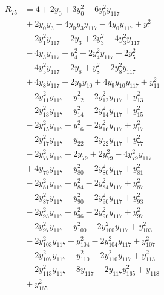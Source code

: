 \begin{align*}
R_{75} &={} 4 +2y_{0} +3y_{0}^{2} -6y_{0}^{2}y_{117} \\
 &{} +2y_{0}y_{3} -4y_{0}y_{3}y_{117} -4y_{0}y_{117} +y_{1}^{2} \\
 &{} -2y_{1}^{2}y_{117} +2y_{3} +2y_{3}^{2} -4y_{3}^{2}y_{117} \\
 &{} -4y_{3}y_{117} +y_{4}^{2} -2y_{4}^{2}y_{117} +2y_{5}^{2} \\
 &{} -4y_{5}^{2}y_{117} -2y_{8} +y_{8}^{2} -2y_{8}^{2}y_{117} \\
 &{} +4y_{8}y_{117} -2y_{9}y_{10} +4y_{9}y_{10}y_{117} +y_{11}^{2} \\
 &{} -2y_{11}^{2}y_{117} +y_{12}^{2} -2y_{12}^{2}y_{117} +y_{13}^{2} \\
 &{} -2y_{13}^{2}y_{117} +y_{14}^{2} -2y_{14}^{2}y_{117} +y_{15}^{2} \\
 &{} -2y_{15}^{2}y_{117} +y_{16}^{2} -2y_{16}^{2}y_{117} +y_{17}^{2} \\
 &{} -2y_{17}^{2}y_{117} +y_{22} -2y_{22}y_{117} +y_{77}^{2} \\
 &{} -2y_{77}^{2}y_{117} -2y_{79} +2y_{79}^{2} -4y_{79}^{2}y_{117} \\
 &{} +4y_{79}y_{117} +y_{80}^{2} -2y_{80}^{2}y_{117} +y_{81}^{2} \\
 &{} -2y_{81}^{2}y_{117} +y_{84}^{2} -2y_{84}^{2}y_{117} +y_{87}^{2} \\
 &{} -2y_{87}^{2}y_{117} +y_{90}^{2} -2y_{90}^{2}y_{117} +y_{93}^{2} \\
 &{} -2y_{93}^{2}y_{117} +y_{96}^{2} -2y_{96}^{2}y_{117} +y_{97}^{2} \\
 &{} -2y_{97}^{2}y_{117} +y_{100}^{2} -2y_{100}^{2}y_{117} +y_{103}^{2} \\
 &{} -2y_{103}^{2}y_{117} +y_{104}^{2} -2y_{104}^{2}y_{117} +y_{107}^{2} \\
 &{} -2y_{107}^{2}y_{117} +y_{110}^{2} -2y_{110}^{2}y_{117} +y_{113}^{2} \\
 &{} -2y_{113}^{2}y_{117} -8y_{117} -2y_{117}y_{165}^{2} +y_{118} \\
 &{} +y_{165}^{2}
\end{align*}
